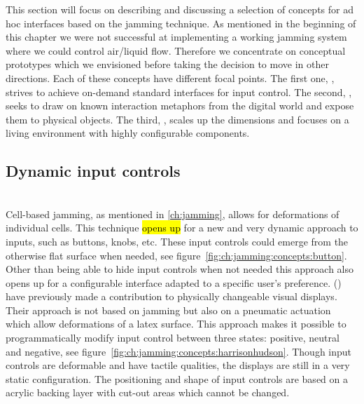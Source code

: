 This section will focus on describing and discussing a selection of concepts for ad hoc interfaces based on the jamming technique.
As mentioned in the beginning of this chapter we were not successful at implementing a working jamming system where we could control air/liquid flow. 
Therefore we concentrate on conceptual prototypes which we envisioned before taking the decision to move in other directions.
Each of these concepts have different focal points.
The first one, \emph{  }, strives to achieve on-demand standard interfaces for input control.
The second, \emph{  }, seeks to draw on known interaction metaphors from the digital world and  expose them to physical objects.
The third, \emph{  }, scales up the dimensions and focuses on a living environment with highly configurable components.
\blank
{}

\subsection{Dynamic input controls} 
\label{ch:jamming:concepts:dynamic_input}

\\

Cell-based jamming, as mentioned in \ref{ch:jamming}, allows for deformations of individual cells.
This technique \hl{opens up} for a new and very dynamic approach to inputs, such as buttons, knobs, etc.
These input controls could emerge from the otherwise flat surface when needed, see figure~\ref{fig:ch:jamming:concepts:button}.
Other than being able to hide input controls when not needed this approach also opens up for a configurable interface adapted to a specific user's preference.
\citet{harrison2009providing} (\citeyear{harrison2009providing}) have previously made a contribution to physically changeable visual displays.
Their approach is not based on jamming but also on a pneumatic actuation which allow deformations of a latex surface.
This approach makes it possible to programmatically modify input control between three states: positive, neutral and negative, see figure~\ref{fig:ch:jamming:concepts:harrisonhudson}.
Though input controls are deformable and have tactile qualities, the displays are still in a very static configuration.
The positioning and shape of input controls are based on a acrylic backing layer with cut-out areas which cannot be changed.

